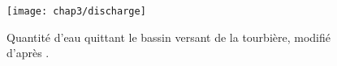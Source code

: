 \begin{figure}
\centering
\texttt{[image: chap3/discharge]}
\caption{Quantité d'eau quittant le bassin versant de la tourbière, modifié d'après \citet{binet2013}.}
\label{fig:discharge}
\end{figure}


%
%
